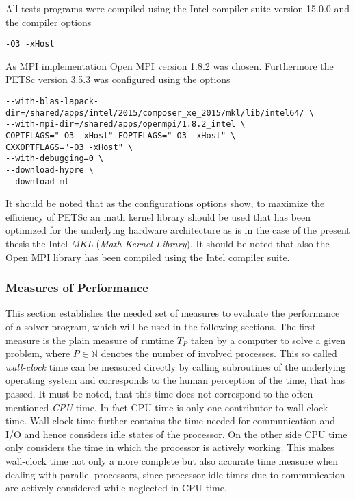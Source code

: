 All tests programs were compiled using the Intel compiler suite version 15.0.0 and the compiler options
\begin{lstlisting}
-O3 -xHost
\end{lstlisting}
As MPI implementation Open MPI version 1.8.2 was chosen. Furthermore the PETSc version 3.5.3 was configured using the options
\begin{lstlisting}
--with-blas-lapack-dir=/shared/apps/intel/2015/composer_xe_2015/mkl/lib/intel64/ \
--with-mpi-dir=/shared/apps/openmpi/1.8.2_intel \
COPTFLAGS="-O3 -xHost" FOPTFLAGS="-O3 -xHost" \
CXXOPTFLAGS="-O3 -xHost" \
--with-debugging=0 \
--download-hypre \
--download-ml
\end{lstlisting}
It should be noted that as the configurations options show, to maximize the efficiency of PETSc an math kernel library should be used that has been optimized for the underlying hardware architecture as is in the case of the present thesis the Intel \emph{MKL} (\emph{Math Kernel Library}). It should be noted that also the Open MPI library has been compiled using the Intel compiler suite.

\subsubsection{Measures of Performance}

This section establishes the needed set of measures to evaluate the performance of a solver program, which will be used in the following sections. The first measure is the plain measure of runtime \(T_P\) taken by a computer to solve a given problem, where \(P \in \mathbb{N}\) denotes the number of involved processes. This so called \emph{wall-clock} time can be measured directly by calling subroutines of the underlying operating system and corresponds to the human perception of the time, that has passed. It must be noted, that this time does not correspond to the often mentioned \emph{CPU} time. In fact CPU time is only one contributor to wall-clock time. Wall-clock time further contains the time needed for communication and I/O and hence considers idle states of the processor. On the other side CPU time only considers the time in which the processor is actively working. This makes wall-clock time not only a more complete but also accurate time measure when dealing with parallel processors, since processor idle times due to communication are actively considered while neglected in CPU time.

